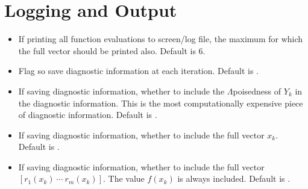 \documentclass[letterpaper,10pt,english]{sphinxmanual}
\begin{document}
\section{Logging and Output}
\label{\detokenize{advanced:logging-and-output}}\begin{itemize}
\item {} 
\sphinxAtStartPar
{} \sphinxhyphen{} If printing all function evaluations to screen/log file, the maximum  for which the full vector  should be printed also. Default is 6.

\item {} 
\sphinxAtStartPar
{} \sphinxhyphen{} Flag so save diagnostic information at each iteration. Default is .

\item {} 
\sphinxAtStartPar
{} \sphinxhyphen{} If saving diagnostic information, whether to include the \(\Lambda\)\sphinxhyphen{}poisedness of \(Y_k\) in the diagnostic information. This is the most computationally expensive piece of diagnostic information. Default is .

\item {} 
\sphinxAtStartPar
{} \sphinxhyphen{} If saving diagnostic information, whether to include the full vector \(x_k\). Default is .

\item {} 
\sphinxAtStartPar
{} \sphinxhyphen{} If saving diagnostic information, whether to include the full vector \([r_1(x_k)\:\cdots\:r_m(x_k)]\). The value \(f(x_k)\) is always included. Default is .

\end{itemize}
\end{document}
